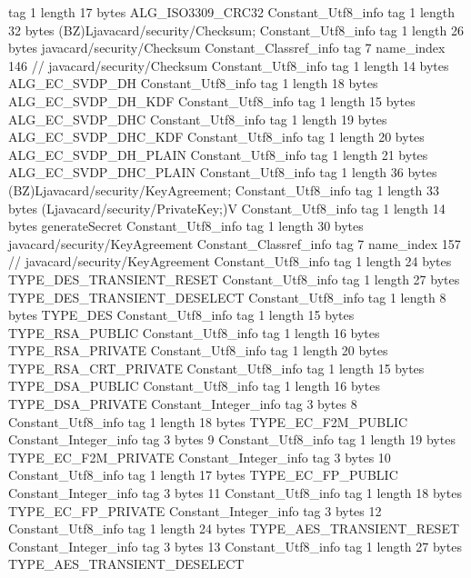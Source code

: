 {{{			tag	1
			length	17
			bytes	ALG_ISO3309_CRC32
		}
		Constant_Utf8_info {
			tag	1
			length	32
			bytes	(BZ)Ljavacard/security/Checksum;
		}
		Constant_Utf8_info {
			tag	1
			length	26
			bytes	javacard/security/Checksum
		}
		Constant_Classref_info {
			tag	7
			name_index	146		// javacard/security/Checksum
		}
		Constant_Utf8_info {
			tag	1
			length	14
			bytes	ALG_EC_SVDP_DH
		}
		Constant_Utf8_info {
			tag	1
			length	18
			bytes	ALG_EC_SVDP_DH_KDF
		}
		Constant_Utf8_info {
			tag	1
			length	15
			bytes	ALG_EC_SVDP_DHC
		}
		Constant_Utf8_info {
			tag	1
			length	19
			bytes	ALG_EC_SVDP_DHC_KDF
		}
		Constant_Utf8_info {
			tag	1
			length	20
			bytes	ALG_EC_SVDP_DH_PLAIN
		}
		Constant_Utf8_info {
			tag	1
			length	21
			bytes	ALG_EC_SVDP_DHC_PLAIN
		}
		Constant_Utf8_info {
			tag	1
			length	36
			bytes	(BZ)Ljavacard/security/KeyAgreement;
		}
		Constant_Utf8_info {
			tag	1
			length	33
			bytes	(Ljavacard/security/PrivateKey;)V
		}
		Constant_Utf8_info {
			tag	1
			length	14
			bytes	generateSecret
		}
		Constant_Utf8_info {
			tag	1
			length	30
			bytes	javacard/security/KeyAgreement
		}
		Constant_Classref_info {
			tag	7
			name_index	157		// javacard/security/KeyAgreement
		}
		Constant_Utf8_info {
			tag	1
			length	24
			bytes	TYPE_DES_TRANSIENT_RESET
		}
		Constant_Utf8_info {
			tag	1
			length	27
			bytes	TYPE_DES_TRANSIENT_DESELECT
		}
		Constant_Utf8_info {
			tag	1
			length	8
			bytes	TYPE_DES
		}
		Constant_Utf8_info {
			tag	1
			length	15
			bytes	TYPE_RSA_PUBLIC
		}
		Constant_Utf8_info {
			tag	1
			length	16
			bytes	TYPE_RSA_PRIVATE
		}
		Constant_Utf8_info {
			tag	1
			length	20
			bytes	TYPE_RSA_CRT_PRIVATE
		}
		Constant_Utf8_info {
			tag	1
			length	15
			bytes	TYPE_DSA_PUBLIC
		}
		Constant_Utf8_info {
			tag	1
			length	16
			bytes	TYPE_DSA_PRIVATE
		}
		Constant_Integer_info {
			tag	3
			bytes	8
		}
		Constant_Utf8_info {
			tag	1
			length	18
			bytes	TYPE_EC_F2M_PUBLIC
		}
		Constant_Integer_info {
			tag	3
			bytes	9
		}
		Constant_Utf8_info {
			tag	1
			length	19
			bytes	TYPE_EC_F2M_PRIVATE
		}
		Constant_Integer_info {
			tag	3
			bytes	10
		}
		Constant_Utf8_info {
			tag	1
			length	17
			bytes	TYPE_EC_FP_PUBLIC
		}
		Constant_Integer_info {
			tag	3
			bytes	11
		}
		Constant_Utf8_info {
			tag	1
			length	18
			bytes	TYPE_EC_FP_PRIVATE
		}
		Constant_Integer_info {
			tag	3
			bytes	12
		}
		Constant_Utf8_info {
			tag	1
			length	24
			bytes	TYPE_AES_TRANSIENT_RESET
		}
		Constant_Integer_info {
			tag	3
			bytes	13
		}
		Constant_Utf8_info {
			tag	1
			length	27
			bytes	TYPE_AES_TRANSIENT_DESELECT
}}}

